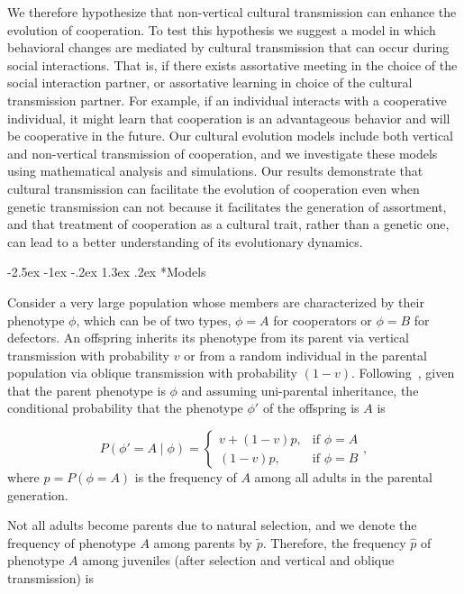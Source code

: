 \documentclass[12pt]{extarticle}
\makeatletter
\renewcommand\section{\@startsection {section}{1}{\z@}%
     {-2.5ex \@plus -1ex \@minus -.2ex}%
     {1.3ex \@plus.2ex}%
    {\Large\bfseries}}
\makeatother
\begin{document}
We therefore hypothesize that non-vertical cultural transmission can enhance the evolution of cooperation.
To test this hypothesis we suggest a model in which behavioral changes are mediated by cultural transmission that can occur during social interactions. That is, if there exists assortative meeting in the choice of the social interaction partner, or assortative learning in choice of the cultural transmission partner.
For example, if an individual interacts with a cooperative individual, it might learn that cooperation is an advantageous behavior and will be cooperative in the future. 
Our cultural evolution models include both vertical and non-vertical transmission of cooperation, and we investigate these models using mathematical analysis and simulations.  
Our results demonstrate that cultural transmission can facilitate the evolution of cooperation even when genetic transmission can not because it facilitates the generation of assortment, and that treatment of cooperation as a cultural trait, rather than a genetic one, can lead to a better understanding of its evolutionary dynamics.


\section*{Models}

Consider a very large population whose members are characterized by their phenotype $\phi$, which can be of two types, $\phi=A$ for cooperators or $\phi=B$ for defectors.
An offspring inherits its phenotype from its parent via vertical transmission with probability $v$ or from a random individual in the parental population via oblique transmission with probability $(1-v)$. 
Following~\citet{ram2018evolution}, given that the parent phenotype is $\phi$ and assuming uni-parental inheritance, %
the conditional probability that the phenotype $\phi'$ of the offspring is $A$ is 

\begin{equation} \label{eq:vertical_oblique_transmission}
P(\phi'=A \mid \phi) = \begin{cases}
v + (1-v)p, & \text{if } \phi=A \\
(1-v)p, & \text{if } \phi=B
\end{cases},
\end{equation}
where $p=P(\phi=A)$ is the frequency of $A$ among all adults in the parental generation.  

Not all adults become parents due to natural selection, and we denote the frequency of phenotype $A$ among parents by $\tilde{p}$.
Therefore, the frequency $\hat{p}$ of  phenotype $A$ among juveniles (after selection and vertical and oblique transmission) is
\end{document}
